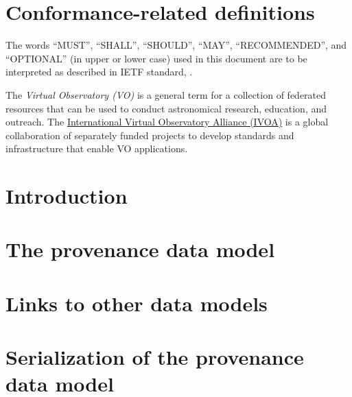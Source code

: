 \documentclass[11pt,a4paper]{ivoa}
\begin{document}
\section*{Conformance-related definitions}

The words ``MUST'', ``SHALL'', ``SHOULD'', ``MAY'', ``RECOMMENDED'', and
``OPTIONAL'' (in upper or lower case) used in this document are to be
interpreted as described in IETF standard, \citet{std:RFC2119}.

The \emph{Virtual Observatory (VO)} is
a general term for a collection of federated resources that can be used
to conduct astronomical research, education, and outreach.
The \href{http://www.ivoa.net}{International
Virtual Observatory Alliance (IVOA)} is a global
collaboration of separately funded projects to develop standards and
infrastructure that enable VO applications.


\section{Introduction}






\section{The provenance data model}
\label{sec:datamodel}



\section{Links to other data models}
\label{sec:dmlinks}



\clearpage
\section{Serialization of the provenance data model}
\label{sec:serialisations}

%
\end{document}
